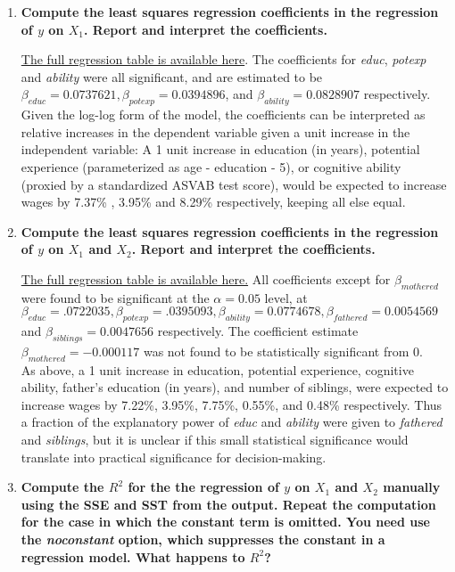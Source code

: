 \documentclass{article}
\begin{document}
\begin{enumerate}[label=\alph*.]
\item \textbf{Compute the least squares regression coefficients in the regression of $y$ on $X_1$. Report and interpret the coefficients.}

\hyperlink{yonx1}{The full regression table is available here}. The coefficients for \textit{educ}, \textit{potexp} and \textit{ability} were all significant, and are estimated to be $\beta_{educ} = 0.0737621, \beta_{potexp}=0 .0394896$, and $\beta_{ability}= 0.0828907 $ respectively. \\

Given the log-log form of the model, the coefficients can be interpreted as relative increases in the dependent variable given a unit increase in the independent variable: A 1 unit increase in education (in years), potential experience (parameterized as age - education - 5), or cognitive ability (proxied by a standardized ASVAB test score), would be expected to increase wages by 7.37\% , 3.95\% and 8.29\% respectively, keeping all else equal.

\item \textbf{Compute the least squares regression coefficients in the regression of $y$  on $X_1$ and $X_2$. Report and interpret the coefficients.}

\hyperlink{yonx1x2}{The full regression table is available here.} All coefficients except for $\beta_{mothered}$ were found to be significant at the $\alpha = 0.05$ level, at $\beta_{educ} = .0722035, \beta_{potexp} = .0395093, \beta_{ability} = 0.0774678, \beta_{fathered} = 0.0054569$ and $\beta_{siblings} = 0.0047656 $ respectively. The coefficient estimate $\beta_{mothered} = -0.000117 $ was not found to be statistically significant from 0. \\

As above, a 1 unit increase in education, potential experience, cognitive ability, father's education (in years), and number of siblings, were expected to increase wages by 7.22\%, 3.95\%, 7.75\%, 0.55\%, and 0.48\% respectively. Thus a fraction of the explanatory power of \textit{educ} and \textit{ability} were given to \textit{fathered} and \textit{siblings}, but it is unclear if this small statistical significance would translate into practical significance for decision-making.

\newpage
\item \textbf{Compute the $R^2$ for the the regression of $y$ on $X_1$ and $X_2$ manually using the SSE and SST from the output. Repeat the computation for the case in which the constant term is omitted. You need use the \textit{noconstant} option, which suppresses the constant in a regression model. What happens to $R^2$?}


\end{enumerate}
\end{document}
